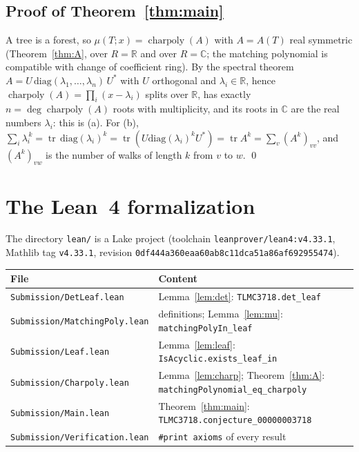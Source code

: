 \documentclass[11pt,a4paper]{article}
\theoremstyle{definition}
\theoremstyle{remark}
\newcommand{\R}{\mathbb{R}}
\newcommand{\C}{\mathbb{C}}
\DeclareMathOperator{\tr}{tr}
\DeclareMathOperator{\charp}{charpoly}
\begin{document}
\subsection{Proof of Theorem~\ref{thm:main}}
A tree is a forest, so $\mu(T;x)=\charp(A)$ with $A=A(T)$ real symmetric
(Theorem~\ref{thm:A}, over $R=\R$ and over $R=\C$; the matching polynomial is compatible with
change of coefficient ring). By the spectral theorem $A=U\,\mathrm{diag}(\lambda_1,\dots,\lambda_n)\,U^{*}$
with $U$ orthogonal and $\lambda_i\in\R$, hence $\charp(A)=\prod_i(x-\lambda_i)$ splits over $\R$,
has exactly $n=\deg\charp(A)$ roots with multiplicity, and its roots in $\C$ are the real numbers
$\lambda_i$: this is (a). For (b), $\sum_i\lambda_i^{\,k}=\tr\,\mathrm{diag}(\lambda_i)^k
=\tr(U\mathrm{diag}(\lambda_i)^kU^{*})=\tr A^k=\sum_v (A^k)_{vv}$, and $(A^k)_{vw}$ is the
number of walks of length $k$ from $v$ to $w$. \qed

\section{The Lean~4 formalization}

The directory \texttt{lean/} is a Lake project (toolchain \texttt{leanprover/lean4:v4.33.1},
Mathlib tag \texttt{v4.33.1}, revision \texttt{0df444a360eaa60ab8c11dca51a86af692955474}).
\begin{center}\footnotesize
\begin{tabular}{@{}ll@{}}
\toprule
File & Content\\
\midrule
\texttt{Submission/DetLeaf.lean} & Lemma~\ref{lem:det}: \texttt{TLMC3718.det\_leaf}\\
\texttt{Submission/MatchingPoly.lean} & definitions; Lemma~\ref{lem:mu}: \texttt{matchingPolyIn\_leaf}\\
\texttt{Submission/Leaf.lean} & Lemma~\ref{lem:leaf}: \texttt{IsAcyclic.exists\_leaf\_in}\\
\texttt{Submission/Charpoly.lean} & Lemma~\ref{lem:charp}; Theorem~\ref{thm:A}: \texttt{matchingPolynomial\_eq\_charpoly}\\
\texttt{Submission/Main.lean} & Theorem~\ref{thm:main}: \texttt{TLMC3718.conjecture\_00000003718}\\
\texttt{Submission/Verification.lean} & \texttt{\#print axioms} of every result\\
\bottomrule
\end{tabular}
\end{center}
\end{document}
